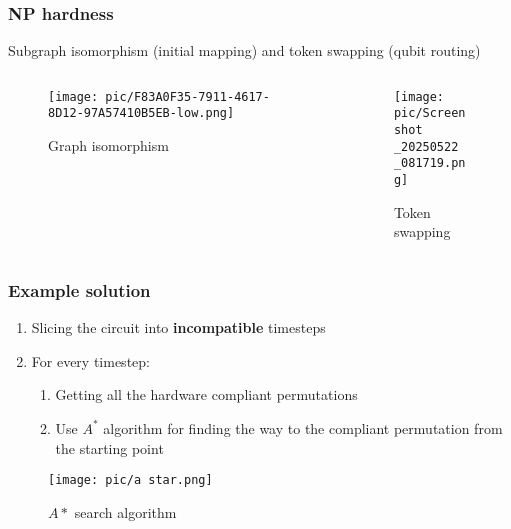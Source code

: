 \documentclass[lualatex,compress,12pt]{beamer}
\begin{document}
\begin{frame}
	\frametitle{NP hardness}
	
	
	Subgraph isomorphism (initial mapping) and token swapping (qubit routing)
	\begin{columns}[b]
		\begin{column}{.5\textwidth}
			\begin{figure}
				\centering
				\texttt{[image: pic/F83A0F35-7911-4617-8D12-97A57410B5EB-low.png]}
				\tiny
				\caption{ Graph isomorphism}
			\end{figure}      
		\end{column}
		\begin{column}{.5\textwidth}
			\begin{figure}
				\centering
				\texttt{[image: pic/Screenshot\\\_20250522\\\_081719.png]}
				\tiny
				\caption{ Token swapping \parencite{yamanakaSwappingLabeledTokens2015}}
			\end{figure}
		\end{column}
	\end{columns}
	
\end{frame}	

\begin{frame}
	\frametitle{Example solution \parencite{zulehnerEfficientMethodologyMapping2018}}
	
	
	\begin{enumerate}
	
	\item Slicing the circuit into \textbf{incompatible} timesteps
	
	\item For every timestep:
\begin{enumerate}
		\item Getting all the hardware compliant permutations
		\item Use \(A^*\) algorithm for finding the way to the compliant permutation from the starting point
	\end{enumerate}

	
	\end{enumerate}
	
	\begin{figure}
		\centering
		\texttt{[image: pic/a star.png]}
		\tiny
		\caption{ \(A*\) search algorithm }
	\end{figure}
	
\end{frame}	
\end{document}
